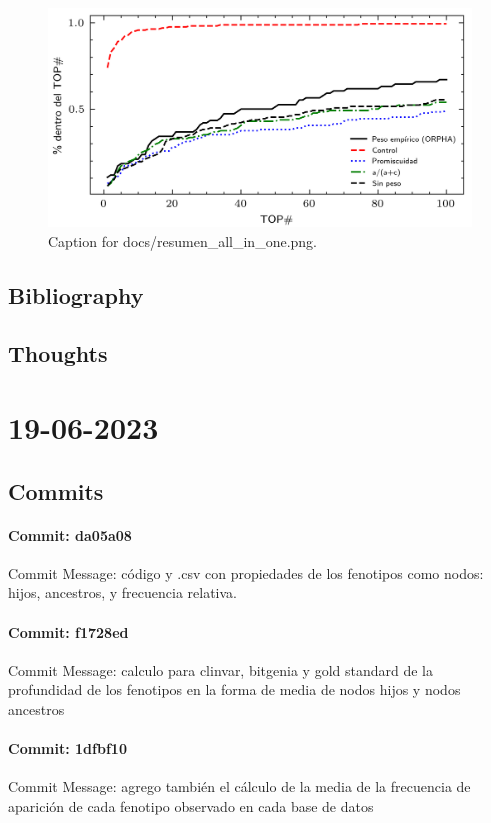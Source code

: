 \documentclass{article}
\begin{document}
\begin{figure}[h] \centering \includegraphics{docs/resumen_all_in_one.png} \caption{Caption for docs/resumen_all_in_one.png.} \end{figure}
\subsection{Bibliography}
\subsection{Thoughts}

\section{19-06-2023}
\subsection{Commits}
\paragraph{Commit: da05a08}
Commit Message: código y .csv con propiedades de los fenotipos como nodos: hijos, ancestros, y frecuencia relativa.

\paragraph{Commit: f1728ed}
Commit Message: calculo para clinvar, bitgenia y gold standard de la profundidad de los fenotipos en la forma de media de nodos hijos y nodos ancestros

\paragraph{Commit: 1dfbf10}
Commit Message: agrego también el cálculo de la media de la frecuencia de aparición de cada fenotipo observado en cada base de datos
\end{document}
